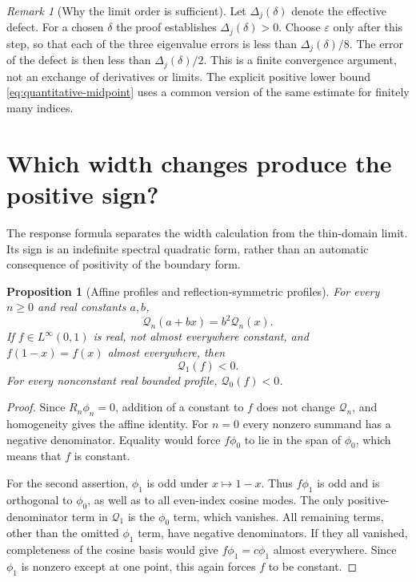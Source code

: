 \documentclass[11pt,a4paper]{article}
\newtheorem{proposition}[theorem]{Proposition}
\theoremstyle{definition}\newtheorem{definition}[theorem]{Definition}
\theoremstyle{remark}\newtheorem{remark}[theorem]{Remark}
\begin{document}
\begin{remark}[Why the limit order is sufficient]
Let $\Delta_j(\delta)$ denote the effective defect. For a chosen
$\delta$ the proof establishes $\Delta_j(\delta)>0$. Choose
$\varepsilon$ only after this step, so that each of the three
eigenvalue errors is less than $\Delta_j(\delta)/8$.
The error of the defect is then less than $\Delta_j(\delta)/2$.
This is a finite convergence argument, not an exchange of
derivatives or limits. The explicit positive lower bound
\eqref{eq:quantitative-midpoint} uses a common version of the
same estimate for finitely many indices.
\end{remark}
\section{Which width changes produce the positive sign?}
\label{sec:profiles}

The response formula separates the width calculation from the
thin-domain limit. Its sign is an indefinite spectral quadratic
form, rather than an automatic consequence of positivity of the
boundary form.

\begin{proposition}[Affine profiles and reflection-symmetric profiles]
\label{prop:profile-signs}
For every $n\geq0$ and real constants $a,b$,
\[
 \mathcal Q_n(a+bx)=b^2\mathcal Q_n(x).
\]
If $f\in L^\infty(0,1)$ is real, not almost everywhere constant,
and $f(1-x)=f(x)$ almost everywhere, then
\[
 \mathcal Q_1(f)<0.
\]
For every nonconstant real bounded profile,
$\mathcal Q_0(f)<0$.
\end{proposition}
\begin{proof}
Since $R_n\phi_n=0$, addition of a constant to $f$ does not
change $\mathcal Q_n$, and homogeneity gives the affine identity.
For $n=0$ every nonzero summand has a negative denominator.
Equality would force $f\phi_0$ to lie in the span of $\phi_0$,
which means that $f$ is constant.

For the second assertion, $\phi_1$ is odd under $x\mapsto1-x$.
Thus $f\phi_1$ is odd and is orthogonal to $\phi_0$, as well as
to all even-index cosine modes. The only positive-denominator
term in $\mathcal Q_1$ is the $\phi_0$ term, which vanishes.
All remaining terms, other than the omitted $\phi_1$ term, have
negative denominators. If they all vanished, completeness of the
cosine basis would give $f\phi_1=c\phi_1$ almost everywhere.
Since $\phi_1$ is nonzero except at one point, this again forces
$f$ to be constant.
\end{proof}
\end{document}

